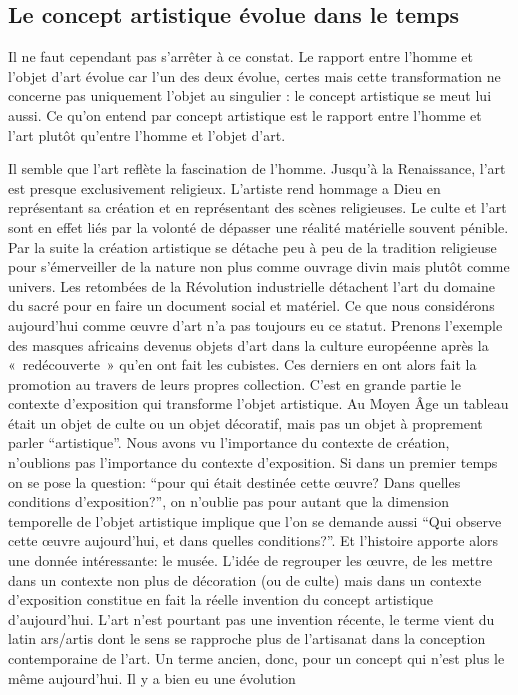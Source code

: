 \subsection{Le concept artistique évolue dans le temps}
\xspace

	Il ne faut cependant pas s'arrêter à ce constat. Le rapport entre l'homme et l'objet d'art évolue car l'un des deux évolue, certes mais cette transformation ne concerne pas uniquement l'objet au singulier : le concept artistique se meut lui aussi. Ce qu'on entend par concept artistique est le rapport entre l'homme et l'art plutôt qu'entre l'homme et l'objet d'art.

Il semble que l'art reflète la fascination de l'homme. Jusqu'à la Renaissance, l'art est presque exclusivement religieux. L'artiste rend hommage a Dieu en représentant sa création et en représentant des scènes religieuses. Le culte et l'art sont en effet liés par la volonté de dépasser une réalité matérielle souvent pénible. Par la suite la création artistique se détache peu à peu de la tradition religieuse pour s’émerveiller de la nature non plus comme ouvrage divin mais plutôt comme univers. Les retombées de la Révolution industrielle détachent l'art du domaine du sacré pour en faire un document social et matériel. Ce que nous considérons aujourd'hui comme œuvre d'art n'a pas toujours eu ce statut.
Prenons l’exemple des masques africains devenus objets d’art dans la culture européenne après la « redécouverte » qu’en ont fait les cubistes. Ces derniers en ont alors fait la  promotion au travers de leurs propres collection. C'est en grande partie le contexte d'exposition qui transforme l'objet artistique. Au Moyen Âge un tableau était un objet de culte ou un objet décoratif, mais pas un objet à proprement parler “artistique”. Nous avons vu l'importance du contexte de création, n'oublions pas l'importance du contexte d'exposition. Si dans un premier temps on se pose la question: “pour qui était destinée cette \oe{}uvre? Dans quelles conditions d'exposition?”, on n'oublie pas pour autant que la dimension temporelle de l'objet artistique implique que l'on se demande aussi “Qui observe cette \oe{}uvre aujourd'hui, et dans quelles conditions?”. Et l'histoire apporte alors une donnée intéressante: le musée. L'idée de regrouper les \oe{}uvre, de les mettre dans un contexte non plus de décoration (ou de culte) mais dans un contexte d'exposition constitue en fait la réelle invention du concept artistique d'aujourd'hui. L'art n'est pourtant pas une invention récente, le terme vient du latin ars/artis dont le sens se rapproche plus de l’artisanat dans la conception contemporaine de l’art. Un terme ancien, donc, pour un concept qui n’est plus le même aujourd’hui. Il y a bien eu une évolution  
